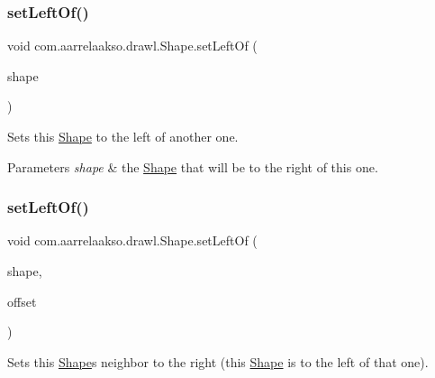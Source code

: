 \subsubsection{\texorpdfstring{set\+Left\+Of()}{setLeftOf()}\hspace{0.1cm}{\footnotesize\ttfamily [1/2]}}
{\footnotesize\ttfamily void com.\+aarrelaakso.\+drawl.\+Shape.\+set\+Left\+Of (\begin{DoxyParamCaption}\item[{@Not\+Null final \hyperlink{classcom_1_1aarrelaakso_1_1drawl_1_1_shape}{Shape}}]{shape }\end{DoxyParamCaption})}



Sets this \hyperlink{classcom_1_1aarrelaakso_1_1drawl_1_1_shape}{Shape} to the left of another one. 


\begin{DoxyParams}{Parameters}
{\em shape} & the \hyperlink{classcom_1_1aarrelaakso_1_1drawl_1_1_shape}{Shape} that will be to the right of this one. \\
\hline
\end{DoxyParams}
\mbox{\label{classcom_1_1aarrelaakso_1_1drawl_1_1_shape_a8012a3823982d77b563ef61787ccb523}} 
\subsubsection{\texorpdfstring{set\+Left\+Of()}{setLeftOf()}\hspace{0.1cm}{\footnotesize\ttfamily [2/2]}}
{\footnotesize\ttfamily void com.\+aarrelaakso.\+drawl.\+Shape.\+set\+Left\+Of (\begin{DoxyParamCaption}\item[{@Not\+Null final \hyperlink{classcom_1_1aarrelaakso_1_1drawl_1_1_shape}{Shape}}]{shape,  }\item[{@Not\+Null final \hyperlink{classcom_1_1aarrelaakso_1_1drawl_1_1_measure}{Measure}}]{offset }\end{DoxyParamCaption})}



Sets this \hyperlink{classcom_1_1aarrelaakso_1_1drawl_1_1_shape}{Shape}\textquotesingle{}s neighbor to the right (this \hyperlink{classcom_1_1aarrelaakso_1_1drawl_1_1_shape}{Shape} is to the left of that one). 


